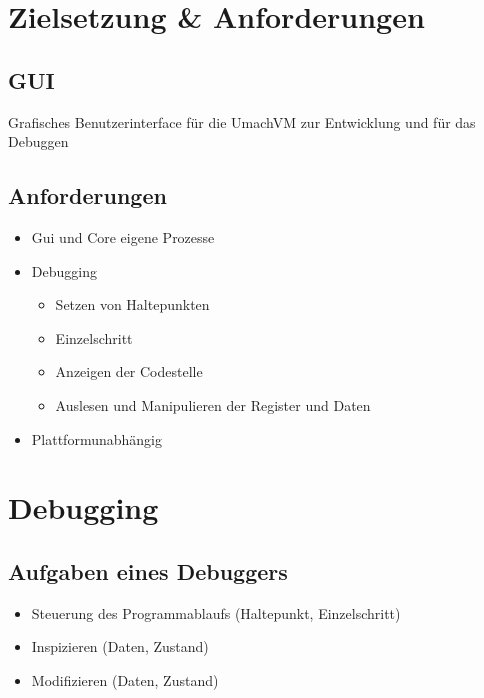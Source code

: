 \section{Zielsetzung \& Anforderungen}

\subsection{GUI}

\begin{frame}{\insertsubsection}
    Grafisches Benutzerinterface für die UmachVM
    zur Entwicklung und für das Debuggen
\end{frame}

\subsection{Anforderungen}

\begin{frame}{\insertsubsection}
    \begin{itemize}
         \item Gui und Core eigene Prozesse
         \item Debugging
	 \begin{itemize}
             \item Setzen von Haltepunkten
             \item Einzelschritt
             \item Anzeigen der Codestelle
             \item Auslesen und Manipulieren der Register und Daten
         \end{itemize}
         \item Plattformunabhängig
    \end{itemize}
\end{frame}

\section{Debugging}

\subsection{Aufgaben eines Debuggers}

\begin{frame}{\insertsubsection}
    \begin{itemize}
         \item Steuerung des Programmablaufs (Haltepunkt, Einzelschritt)
         \item Inspizieren (Daten, Zustand)
         \item Modifizieren (Daten, Zustand)
    \end{itemize}
\end{frame}


